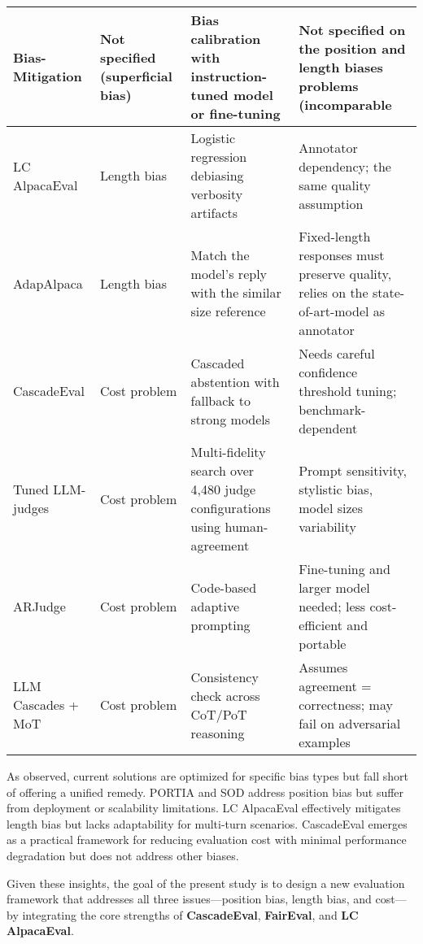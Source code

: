 \documentclass[sigconf, authoryear]{acmart}
\begin{document}
\begin{table}[H]
{\begin{tabular}{|p{2.6cm}|p{1.6cm}|p{3.0cm}|p{4.2cm}|}
            \hline
            Bias-Mitigation    & Not specified (superficial bias) & Bias calibration with instruction-tuned model or fine-tuning                    & Not specified on the position and length biases problems (incomparable                      \\
            \hline
            LC AlpacaEval      & Length bias                      & Logistic regression debiasing verbosity artifacts                               & Annotator dependency; the same quality assumption                                           \\
            \hline
            AdapAlpaca         & Length bias                      & Match the model's reply with the similar size reference                         & Fixed-length responses must preserve quality, relies on the state-of-art-model as annotator \\
            \hline
            CascadeEval        & Cost problem                     & Cascaded abstention with fallback to strong models                              & Needs careful confidence threshold tuning; benchmark-dependent                              \\
            \hline
            Tuned LLM-judges   & Cost problem                     & Multi-fidelity search over 4,480 judge configurations using human-agreement     & Prompt sensitivity, stylistic bias, model sizes variability                                 \\
            \hline
            ARJudge            & Cost problem                     & Code-based adaptive prompting                                                   & Fine-tuning and larger model needed; less cost-efficient and portable                       \\
            \hline
            LLM Cascades + MoT & Cost problem                     & Consistency check across CoT/PoT reasoning                                      & Assumes agreement = correctness; may fail on adversarial examples                           \\
            \hline
        \end{tabular}%
    }
\end{table}

As observed, current solutions are optimized for specific bias types but fall short of offering a unified remedy.
PORTIA and SOD address position bias but suffer from deployment or scalability limitations.
LC AlpacaEval effectively mitigates length bias but lacks adaptability for multi-turn scenarios.
CascadeEval emerges as a practical framework for reducing evaluation cost with minimal performance degradation but does not address other biases.

Given these insights, the goal of the present study is to design a new evaluation framework that addresses all three issues—position bias, length bias, and cost—by integrating the core strengths of \textbf{CascadeEval}, \textbf{FairEval}, and \textbf{LC AlpacaEval}.




\end{document}
